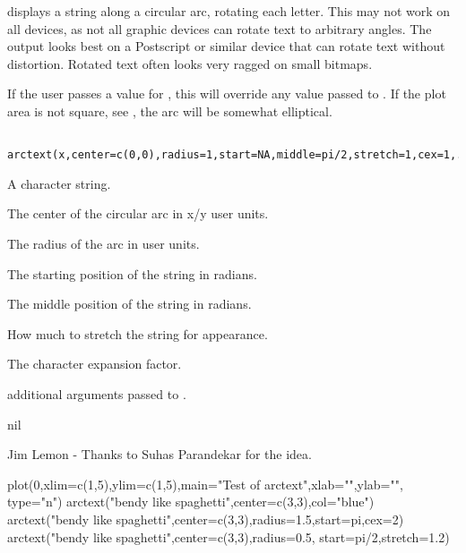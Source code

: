 \begin{Description}\relax
{} displays a string along a circular arc, rotating each
letter. This may not work on all devices, as not all graphic devices
can rotate text to arbitrary angles. The output looks best on a 
Postscript or similar device that can rotate text without distortion.
Rotated text often looks very ragged on small bitmaps.

If the user passes a value for
, this will override any value passed to .
If the plot area is not square, see , the arc will
be somewhat elliptical.
\end{Description}
\begin{Usage}
\begin{verbatim}
 arctext(x,center=c(0,0),radius=1,start=NA,middle=pi/2,stretch=1,cex=1,...)
\end{verbatim}
\end{Usage}
\begin{Arguments}
\begin{ldescription}
\item[\code{x}] A character string.
\item[\code{center}] The center of the circular arc in x/y user units.
\item[\code{radius}] The radius of the arc in user units.
\item[\code{start}] The starting position of the string in radians.
\item[\code{middle}] The middle position of the string in radians.
\item[\code{stretch}] How much to stretch the string for appearance.
\item[\code{cex}] The character expansion factor.
\item[\code{...}] additional arguments passed to .
\end{ldescription}
\end{Arguments}
\begin{Value}
nil
\end{Value}
\begin{Author}\relax
Jim Lemon - Thanks to Suhas Parandekar for the idea.
\end{Author}
\begin{SeeAlso}\relax
{}
\end{SeeAlso}
\begin{Examples}
\begin{ExampleCode}
 plot(0,xlim=c(1,5),ylim=c(1,5),main="Test of arctext",xlab="",ylab="",
  type="n")
 arctext("bendy like spaghetti",center=c(3,3),col="blue")
 arctext("bendy like spaghetti",center=c(3,3),radius=1.5,start=pi,cex=2)
 arctext("bendy like spaghetti",center=c(3,3),radius=0.5,
  start=pi/2,stretch=1.2)
\end{ExampleCode}
\end{Examples}

